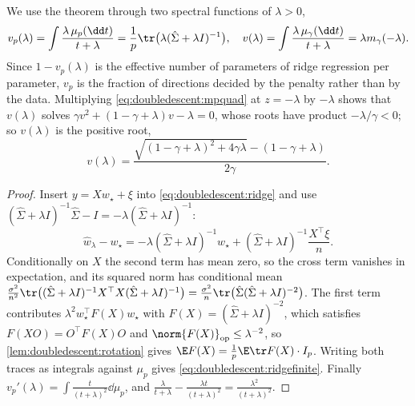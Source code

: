 \begin{refsection}
We use the theorem through two spectral functions of $\lambda>0$,
\[
  v_p(\lambda)=\int\frac{\lambda\,\mu_p(\dd t)}{t+\lambda}=\frac1p\tr\bigl(\lambda(\hat\Sigma+\lambda I)^{-1}\bigr),\quad
  v(\lambda)=\int\frac{\lambda\,\mu_\gamma(\dd t)}{t+\lambda}=\lambda m_\gamma(-\lambda).
\]
Since $1-v_p(\lambda)$ is the effective number of parameters of ridge regression per parameter, $v_p$ is the fraction of directions decided by the penalty rather than by the data. Multiplying \eqref{eq:doubledescent:mpquad} at $z=-\lambda$ by $-\lambda$ shows that $v(\lambda)$ solves $\gamma v^2+(1-\gamma+\lambda)v-\lambda=0$, whose roots have product $-\lambda/\gamma<0$; so $v(\lambda)$ is the positive root,
\begin{equation}\label{eq:doubledescent:v}
  v(\lambda)=\frac{\sqrt{(1-\gamma+\lambda)^2+4\gamma\lambda}-(1-\gamma+\lambda)}{2\gamma}.
\end{equation}


\begin{proof}
Insert $y=Xw_\star+\xi$ into \eqref{eq:doubledescent:ridge} and use $(\hat\Sigma+\lambda I)^{-1}\hat\Sigma-I=-\lambda(\hat\Sigma+\lambda I)^{-1}$:
\[
  \hat w_\lambda-w_\star=-\lambda(\hat\Sigma+\lambda I)^{-1}w_\star+(\hat\Sigma+\lambda I)^{-1}\frac{X^\top\xi}n .
\]
Conditionally on $X$ the second term has mean zero, so the cross term vanishes in expectation, and its squared norm has conditional mean $\frac{\sigma^2}{n^2}\tr\bigl((\hat\Sigma+\lambda I)^{-1}X^\top X(\hat\Sigma+\lambda I)^{-1}\bigr)=\frac{\sigma^2}n\tr\bigl(\hat\Sigma(\hat\Sigma+\lambda I)^{-2}\bigr)$. The first term contributes $\lambda^2w_\star^\top F(X)w_\star$ with $F(X)=(\hat\Sigma+\lambda I)^{-2}$, which satisfies $F(XO)=O^\top F(X)O$ and $\norm{F(X)}_{\op}\le\lambda^{-2}$, so \cref{lem:doubledescent:rotation} gives $\E F(X)=\frac1p\E\tr F(X)\cdot I_p$. Writing both traces as integrals against $\mu_p$ gives \eqref{eq:doubledescent:ridgefinite}. Finally $v_p'(\lambda)=\int\frac{t}{(t+\lambda)^2}\dd\mu_p$, and $\frac{\lambda}{t+\lambda}-\frac{\lambda t}{(t+\lambda)^2}=\frac{\lambda^2}{(t+\lambda)^2}$.
\end{proof}


\end{refsection}
